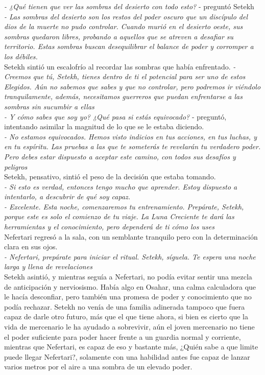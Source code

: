 \textit{- ¿Qué tienen que ver las sombras del desierto con todo esto?} - preguntó Setekh\\
\textit{- Las sombras del desierto son los restos del poder oscuro que un discípulo del dios de la muerte no pudo controlar. Cuando murió en el desierto oeste, sus sombras quedaron libres, probando a aquellos que se atreven a desafiar su territorio. Estas sombras buscan desequilibrar el balance de poder y corromper a los débiles.}\\
Setekh sintió un escalofrío al recordar las sombras que había enfrentado.
\textit{- Creemos que tú, Setekh, tienes dentro de ti el potencial para ser uno de estos Elegidos. Aún no sabemos que sabes y que no controlar, pero podremos ir viéndolo tranquilamente, además, necesitamos guerreros que puedan enfrentarse a las sombras sin sucumbir a ellas}\\
\textit{- Y cómo sabes que soy yo? ¿Qué pasa si estás equivocado?} - preguntó, intentando asimilar la magnitud de lo que se le estaba diciendo.\\
\textit{- No estamos equivocados. Hemos visto indicios en tus acciones, en tus luchas, y en tu espíritu. Las pruebas a las que te someterás te revelarán tu verdadero poder. Pero debes estar dispuesto a aceptar este camino, con todos sus desafíos y peligros}\\
Setekh, pensativo, sintió el peso de la decisión que estaba tomando.\\
\textit{- Si esto es verdad, entonces tengo mucho que aprender. Estoy dispuesto a intentarlo, a descubrir de qué soy capaz.}\\
\textit{- Excelente. Esta noche, comenzaremos tu entrenamiento. Prepárate, Setekh, porque este es solo el comienzo de tu viaje. La Luna Creciente te dará las herramientas y el conocimiento, pero dependerá de ti cómo los uses}\\
Nefertari regresó a la sala, con un semblante tranquilo pero con la determinación clara en sus ojos.\\
\textit{- Nefertari, prepárate para iniciar el ritual. Setekh, síguela. Te espera una noche larga y llena de revelaciones}\\
Setekh asintió, y mientras seguía a Nefertari, no podía evitar sentir una mezcla de anticipación y nerviosismo. Había algo en Osahar, una calma calculadora que le hacía desconfiar, pero también una promesa de poder y conocimiento que no podía rechazar.
Setekh no venía de una familia adinerada tampoco que fuera capaz de darle otro futuro, más que el que tiene ahora, si bien es cierto que la vida de mercenario le ha ayudado a sobrevivir, aún el joven mercenario no tiene el poder suficiente para poder hacer frente
a un guardia normal y corriente, mientras que Nefertari, es capaz de eso y bastante más, ¿Quién sabe a que limite puede llegar Nefertari?, solamente con una habilidad antes fue capaz de lanzar varios metros por el aire a una sombra de un elevado poder.

